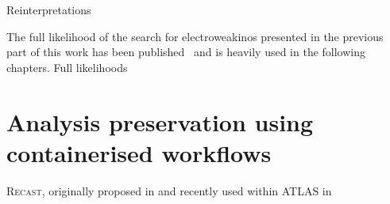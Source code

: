 Reinterpretations 

The full likelihood of the search for electroweakinos presented in the previous part of this work has been published~\cite{fullLH_1Lbb} and is heavily used in the following chapters.
Full likelihoods~\cite{ATL-PHYS-PUB-2019-029}


\section{Analysis preservation using containerised workflows}\label{sec:recast_implementation}




\textsc{Recast}, originally proposed in \cite{RECAST_cranmer} and recently used within ATLAS in \eg {}\cite{ATL-PHYS-PUB-2019-032}